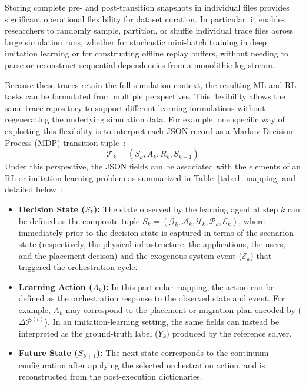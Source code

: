\documentclass[ASNA]{USG} %
\begin{document}
Storing complete pre- and post-transition snapshots in individual files provides significant operational flexibility for dataset curation. In particular, it enables researchers to randomly sample, partition, or shuffle individual trace files across large simulation runs, whether for stochastic mini-batch training in deep imitation learning or for constructing offline replay buffers, without needing to parse or reconstruct sequential dependencies from a monolithic log stream.


Because these traces retain the full simulation context, the resulting ML and RL tasks can be formulated from multiple perspectives. This flexibility allows the same trace repository to support different learning formulations without regenerating the underlying simulation data. For example, one specific way of exploiting this flexibility is to interpret each JSON record as a Markov Decision Process (MDP) transition tuple~\cite{Sheng2021Deep}:
\begin{equation}
    \mathcal{T}_k = (S_k, A_k, R_k, S_{k+1})
\end{equation}
Under this perspective, the JSON fields can be associated with the elements of an RL or imitation-learning problem as summarized in Table~\ref{tab:rl_mapping} and detailed below~\cite{Liu2023Task}:
\begin{itemize}
    \item \textbf{Decision State ($S_k$):} The state observed by the learning agent at step $k$ can be defined as the composite tuple $S_k = (\mathcal{G}_k, \mathcal{A}_k, \mathcal{U}_k, \mathcal{P}_k, \mathcal{E}_k)$, where immediately prior to the decision state is captured in terms of the scenarion state (respectively, the physical infrastructure, the applications, the users, and the placement decison) and the exogenous system event ($\mathcal{E}_k$) that triggered the orchestration cycle.
    \item \textbf{Learning Action ($A_k$):} In this particular mapping, the action can be defined as the orchestration response to the observed state and event. For example, $A_k$ may correspond to the placement or migration plan encoded by ($\Delta \mathcal{P}^{(t)}$). In an imitation-learning setting, the same fields can instead be interpreted as the ground-truth label ($Y_k$) produced by the reference solver.
    \item \textbf{Future State ($S_{k+1}$):} The next state corresponds to the continuum configuration after applying the selected orchestration action, and is reconstructed from the post-execution dictionaries.
\end{itemize}
\end{document}
